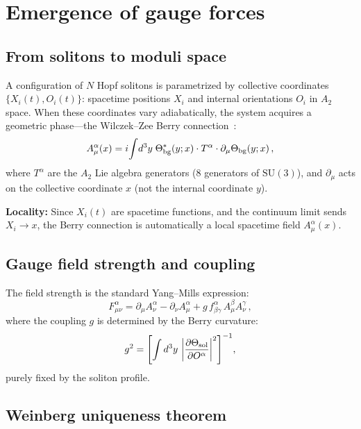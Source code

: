 \documentclass[twocolumn,preprintnumbers,amsmath,amssymb,prd]{revtex4-2}
\begin{document}
\section{Emergence of gauge forces}
\label{sec:gauge}

\subsection{From solitons to moduli space}

A configuration of $N$ Hopf solitons is parametrized by collective coordinates $\{X_i(t), O_i(t)\}$: spacetime positions $X_i$ and internal orientations $O_i$ in $A_2$ space.
When these coordinates vary adiabatically, the system acquires a geometric phase---the Wilczek--Zee Berry connection~\cite{WilczekZee1984}:
\begin{equation}
A_\mu^\alpha(x) = i\!\int\! d^3y\;\Theta^*_{\rm bg}(y;x)\cdot T^\alpha\cdot\partial_\mu\Theta_{\rm bg}(y;x)\,,
\label{eq:berry}
\end{equation}
where $T^\alpha$ are the $A_2$ Lie algebra generators (8 generators of $\mathrm{SU}(3)$), and $\partial_\mu$ acts on the collective coordinate $x$ (not the internal coordinate $y$).

\textbf{Locality:} Since $X_i(t)$ are spacetime functions, and the continuum limit sends $X_i \to x$, the Berry connection is automatically a local spacetime field $A_\mu^\alpha(x)$.

\subsection{Gauge field strength and coupling}

The field strength is the standard Yang--Mills expression:
\begin{equation}
F_{\mu\nu}^\alpha = \partial_\mu A_\nu^\alpha - \partial_\nu A_\mu^\alpha + g\,f^\alpha_{\beta\gamma}\,A_\mu^\beta A_\nu^\gamma\,,
\end{equation}
where the coupling $g$ is determined by the Berry curvature:
\begin{equation}
g^2 = \left[\int d^3y\,\left|\frac{\partial\Theta_{\rm sol}}{\partial O^\alpha}\right|^2\right]^{-1}\!,
\end{equation}
purely fixed by the soliton profile.

\subsection{Weinberg uniqueness theorem}
\end{document}
